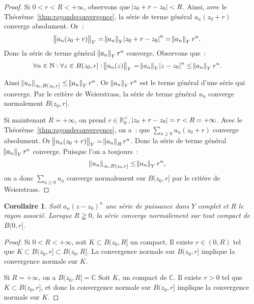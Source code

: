 \documentclass{report}
\newtheorem{cor}[thm]{Corollaire}
\theoremstyle{definition}
\theoremstyle{remark}
\numberwithin{equation}{section}
\newcommand{\C}{\mathbb C}
\newcommand{\R}{\mathbb R}
\newcommand{\Rp}{\R^{+}}
\newcommand{\N}{\mathbb N}
\newcommand{\pinfty}{{+\infty}}
\begin{document}
			\begin{proof} Si $0 < r < R < \pinfty$, observons que $\abs {z_0 + r - z_0} < R$. Ainsi, avec le Théorème~\ref{thm:rayondeconvergence}, la série
			de terme général $a_n(z_0 + r)$ converge absolument. Or~:
			\begin{equation}
				\norm {a_n(z_0 + r)}_Y = \norm {a_n}_Y\abs {z_0 + r - z_0}^n = \norm {a_n}_Yr^n.
			\end{equation}
			Donc la série de terme général $\norm {a_n}_Yr^n$ converge. Observons que~:
			\begin{equation}
				\forall n \in \N : \forall z \in B(z_0, r] : \norm {u_n(z)}_Y = \norm {a_n}_Y\abs {z - z_0}^n \leq \norm {a_n}_Yr^n.
			\end{equation}

			Ainsi $\norm {u_n}_{\infty, B(z_0, r]} \leq \norm {a_n}_Yr^n$. Or $\norm {a_n}_Yr^n$ est le terme général d'une série qui converge. Par le critère
			de Weierstrass, la série de terme général $u_n$ converge normalement $B(z_0, r]$.

			Si maintenant $R = \pinfty$, on prend $r \in \Rp_0$, $\abs {z_0 + r - z_0} = r < R = \pinfty$. Avec le Théorème~\ref{thm:rayondeconvergence}, on a~:
			que $\sum_{n \geq 0}u_n(z_0 + r)$ converge absolument. Or $\norm {u_n(z_0 + r)}_Y = \norm {a_n}_Rr^n$. Donc la série de terme général
			$\norm {a_n}_Yr^n$ converge. Puisque l'on a toujours~:
			\begin{equation}
				\norm {u_n}_{\infty, B(z_0, r]} \leq \norm {a_n}_Yr^n,
			\end{equation}
			on a donc $\sum_{n \geq 0}u_n$ converge normalement sur $B(z_0, r]$ par le critère de Weierstrass.
			\end{proof}

			\begin{cor} Soit $a_n(z - z_0)^n$ une série de puissance dans $Y$ complet et $R$ le rayon associé. Lorsque $R \gneqq 0$, la série converge normalement
			sur tout compact de $B(0, r[$.
			\end{cor}

			\begin{proof} Si $0 < R < \pinfty$, soit $K \subset B(z_0, R[$ un compact. Il existe $r \in (0, R)$ tel que $K \subset B(z_0, r] \subset B(z_0, R[$.
			La convergence normale sur $B(z_0, r]$ implique la convergence normale sur $K$.

			Si $R = \pinfty$, on a $B(z_0, R[ = \C$ Soit $K$, un compact de $\C$. Il existe $r > 0$ tel que $K \subset B(z_0, r]$, et donc la convergence
			normale sur $B(z_0, r]$ implique la convergence normale sur $K$.
			\end{proof}
\end{document}
